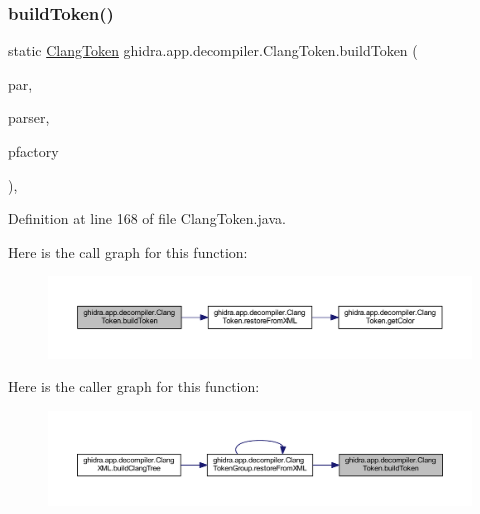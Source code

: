 \subsubsection{\texorpdfstring{buildToken()}{buildToken()}}
{\footnotesize\ttfamily static \mbox{\hyperlink{classghidra_1_1app_1_1decompiler_1_1_clang_token}{Clang\+Token}} ghidra.\+app.\+decompiler.\+Clang\+Token.\+build\+Token (\begin{DoxyParamCaption}\item[{\mbox{\hyperlink{interfaceghidra_1_1app_1_1decompiler_1_1_clang_node}{Clang\+Node}}}]{par,  }\item[{Xml\+Pull\+Parser}]{parser,  }\item[{Pcode\+Factory}]{pfactory }\end{DoxyParamCaption})\hspace{0.3cm}{\ttfamily [inline]}, {\ttfamily [static]}}



Definition at line 168 of file Clang\+Token.\+java.

Here is the call graph for this function\+:
\nopagebreak
\begin{figure}[H]
\begin{center}
\leavevmode
\includegraphics[width=350pt]{classghidra_1_1app_1_1decompiler_1_1_clang_token_a4d678725186dfa338226cce1d16417f5_cgraph}
\end{center}
\end{figure}
Here is the caller graph for this function\+:
\nopagebreak
\begin{figure}[H]
\begin{center}
\leavevmode
\includegraphics[width=350pt]{classghidra_1_1app_1_1decompiler_1_1_clang_token_a4d678725186dfa338226cce1d16417f5_icgraph}
\end{center}
\end{figure}
\mbox{\label{classghidra_1_1app_1_1decompiler_1_1_clang_token_a1a334ac11609a6a1d53d0faca1157d2f}} 
